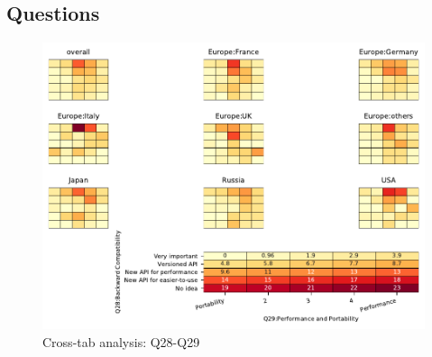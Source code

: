 
\subsection{Questions}


\begin{figure}
\begin{center}
\includegraphics[width=12cm]{../pdfs/Q28-Q29.pdf}
\caption{Cross-tab analysis: Q28-Q29}
\label{fig:Q28-Q29}
\end{center}
\end{figure}
